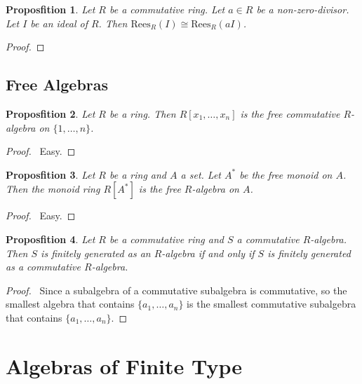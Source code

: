 \documentclass{book}
\let\qed\relax
\newtheorem{prop}{Proposfition}[chapter]
\theoremstyle{definition}
\begin{document}
\begin{prop}
Let $R$ be a commutative ring. Let $a \in R$ be a non-zero-divisor. Let $I$ be an ideal of $R$. Then $\mathrm{Rees}_R(I) \cong \mathrm{Rees}_R(aI)$.
\end{prop}

\begin{proof}
\pf
{}
\qed
\end{proof}

\section{Free Algebras}

\begin{prop}
Let $R$ be a ring. Then $R[x_1, \ldots, x_n]$ is the free commutative $R$-algebra on $\{ 1, \ldots, n \}$.
\end{prop}

\begin{proof}
\pf\ Easy. \qed
\end{proof}

\begin{prop}
Let $R$ be a ring and $A$ a set. Let $A^*$ be the free monoid on $A$. Then the monoid ring $R[A^*]$ is the free $R$-algebra on $A$.
\end{prop}

\begin{proof}
\pf\ Easy. \qed
\end{proof}

\begin{prop}
Let $R$ be a commutative ring and $S$ a commutative $R$-algebra. Then $S$ is finitely generated as an $R$-algebra if and only if $S$ is finitely generated as a commutative $R$-algebra.
\end{prop}

\begin{proof}
\pf\ Since a subalgebra of a commutative subalgebra is commutative, so the smallest algebra that contains $\{a_1, \ldots, a_n\}$ is the smallest commutative subalgebra that contains $\{a_1, \ldots, a_n\}$. \qed
\end{proof}

\chapter{Algebras of Finite Type}
\end{document}
